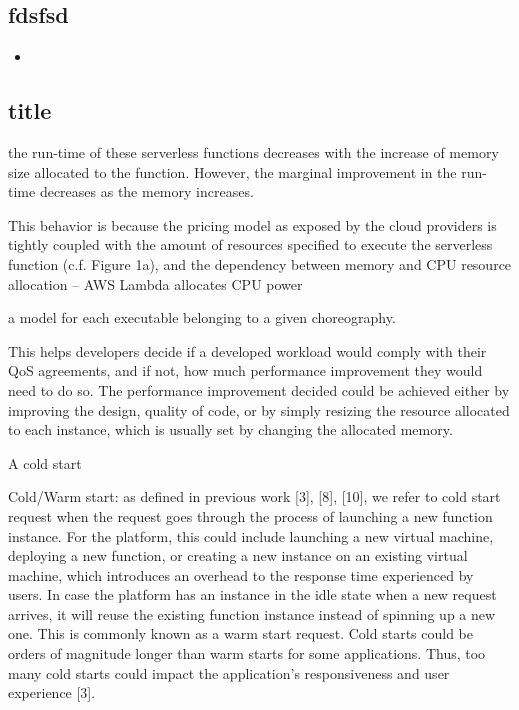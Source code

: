 \documentclass[12pt,a4paper]{report}
\theoremstyle{definition}
\begin{document}
\subsection{fdsfsd}




\begin{itemize}
	\item 
\end{itemize}

\subsection{title}





the run-time of these serverless
functions decreases with the increase of memory size allocated
to the function. However, the marginal improvement in the
run-time decreases as the memory increases.

This behavior
is because the pricing model as exposed by the cloud providers
is tightly coupled with the amount of resources speciﬁed
to execute the serverless function (c.f. Figure 1a), and the
dependency between memory and CPU resource allocation –
AWS Lambda allocates CPU power


a model for each executable belonging to a given choreography.



This helps developers decide if a developed
workload would comply with their QoS agreements, and if
not, how much performance improvement they would need
to do so. The performance improvement decided could be
achieved either by improving the design, quality of code, or
by simply resizing the resource allocated to each instance,
which is usually set by changing the allocated memory.


A cold start 

Cold/Warm start: as deﬁned in previous work [3], [8],
[10], we refer to cold start request when the request goes
through the process of launching a new function instance.
For the platform, this could include launching a new virtual
machine, deploying a new function, or creating a new
instance on an existing virtual machine, which introduces an
overhead to the response time experienced by users. In case
the platform has an instance in the idle state when a new
request arrives, it will reuse the existing function instance
instead of spinning up a new one. This is commonly known
as a warm start request. Cold starts could be orders of
magnitude longer than warm starts for some applications.
Thus, too many cold starts could impact the application’s
responsiveness and user experience [3].
\end{document}
